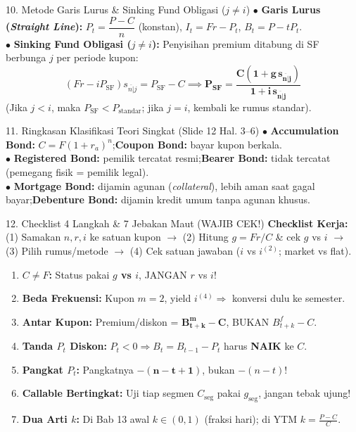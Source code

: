 \documentclass[10pt,a4paper,twocolumn]{article}
\newcommand{\angl}[1]{\overline{#1|}}
\begin{document}
\begin{cbox}{10. Metode Garis Lurus \& Sinking Fund Obligasi ($j \neq i$)}
$\bullet$ \textbf{Garis Lurus (\textit{Straight Line}):} $P_t = \dfrac{P - C}{n}$ (konstan), $I_t = Fr - P_t$, $B_t = P - t P_t$.\\
$\bullet$ \textbf{Sinking Fund Obligasi ($j \neq i$):} Penyisihan premium ditabung di SF berbunga $j$ per periode kupon:
\[
    (Fr - iP_{\text{SF}})s_{\angl{n}j} = P_{\text{SF}} - C \implies \mathbf{P_{\text{SF}} = \frac{C\left(1 + g\,s_{\angl{n}j}\right)}{1 + i\,s_{\angl{n}j}}}
\]
(Jika $j < i$, maka $P_{\text{SF}} < P_{\text{standar}}$; jika $j = i$, kembali ke rumus standar).
\end{cbox}

\begin{abox}{11. Ringkasan Klasifikasi Teori Singkat (Slide 12 Hal. 3--6)}
$\bullet$ \textbf{Accumulation Bond:} $C = F(1+r_a)^n$;\quad \textbf{Coupon Bond:} bayar kupon berkala.\\
$\bullet$ \textbf{Registered Bond:} pemilik tercatat resmi;\quad \textbf{Bearer Bond:} tidak tercatat (pemegang fisik = pemilik legal).\\
$\bullet$ \textbf{Mortgage Bond:} dijamin agunan (\textit{collateral}), lebih aman saat gagal bayar;\quad \textbf{Debenture Bond:} dijamin kredit umum tanpa agunan khusus.
\end{abox}

\begin{rbox}{12. Checklist 4 Langkah \& 7 Jebakan Maut (WAJIB CEK!)}
\textbf{Checklist Kerja:} (1) Samakan $n, r, i$ ke satuan kupon $\to$ (2) Hitung $g = Fr/C$ \& cek $g$ vs $i$ $\to$ (3) Pilih rumus/metode $\to$ (4) Cek satuan jawaban ($i$ vs $i^{(2)}$; market vs flat).
\begin{enumerate}[leftmargin=3.5mm, topsep=0.5pt, itemsep=0.8pt]
    \item \textbf{$C \neq F$:} Status pakai \textbf{$g$ vs $i$}, JANGAN $r$ vs $i$!
    \item \textbf{Beda Frekuensi:} Kupon $m=2$, yield $i^{(4)} \Rightarrow$ konversi dulu ke semester.
    \item \textbf{Antar Kupon:} Premium/diskon = $\mathbf{B_{t+k}^m - C}$, BUKAN $B_{t+k}^f - C$.
    \item \textbf{Tanda $P_t$ Diskon:} $P_t < 0 \Rightarrow B_t = B_{t-1} - P_t$ harus \textbf{NAIK} ke $C$.
    \item \textbf{Pangkat $P_t$:} Pangkatnya $\mathbf{-(n - t + 1)}$, bukan $-(n - t)$!
    \item \textbf{Callable Bertingkat:} Uji tiap segmen $C_{\text{seg}}$ pakai $g_{\text{seg}}$, jangan tebak ujung!
    \item \textbf{Dua Arti $k$:} Di Bab 13 awal $k \in (0,1)$ (fraksi hari); di YTM $k = \frac{P-C}{C}$.
\end{enumerate}
\end{rbox}
\end{document}
